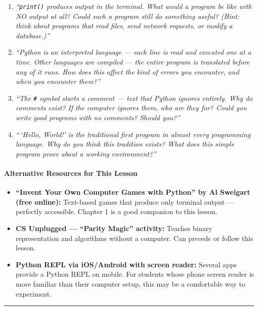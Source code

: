 \documentclass[
  justified,
  openright,
]{tufte-book}
\let\paragraph\paragraph
\let\paragraph\paragraph
\providecommand{\tightlist}{%
  \setlength{\itemsep}{0pt}\setlength{\parskip}{0pt}}
\begin{document}
\begin{enumerate}
\def\labelenumi{\arabic{enumi}.}
\item
  \emph{``\texttt{print()} produces output in the terminal. What would a
  program be like with NO output at all? Could such a program still do
  something useful? (Hint: think about programs that read files, send
  network requests, or modify a database.)''}
\item
  \emph{``Python is an interpreted language --- each line is read and
  executed one at a time. Other languages are compiled --- the entire
  program is translated before any of it runs. How does this affect the
  kind of errors you encounter, and when you encounter them?''}
\item
  \emph{``The \texttt{\#} symbol starts a comment --- text that Python
  ignores entirely. Why do comments exist? If the computer ignores them,
  who are they for? Could you write good programs with no comments?
  Should you?''}
\item
  \emph{``\,`Hello, World!' is the traditional first program in almost
  every programming language. Why do you think this tradition exists?
  What does this simple program prove about a working environment?''}
\end{enumerate}

\paragraph{Alternative Resources for This
Lesson}\label{alternative-resources-for-this-lesson}

\begin{itemize}
\tightlist
\item
  \textbf{``Invent Your Own Computer Games with Python'' by Al Sweigart
  (free online):} Text-based games that produce only terminal output ---
  perfectly accessible. Chapter 1 is a good companion to this lesson.
\item
  \textbf{CS Unplugged --- ``Parity Magic'' activity:} Teaches binary
  representation and algorithms without a computer. Can precede or
  follow this lesson.
\item
  \textbf{Python REPL via iOS/Android with screen reader:} Several apps
  provide a Python REPL on mobile. For students whose phone screen
  reader is more familiar than their computer setup, this may be a
  comfortable way to experiment.
\end{itemize}

\begin{center}\rule{0.5\linewidth}{0.5pt}\end{center}
\end{document}

